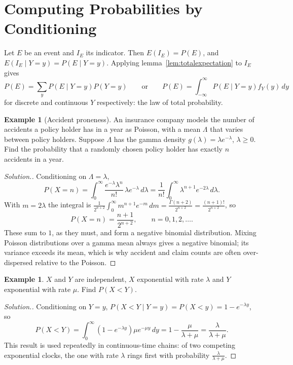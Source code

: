 \documentclass[12pt,a4paper]{report}
\theoremstyle{definition}
\newtheorem{exa}[thm]{Example}
\newenvironment{solution}
  {\renewcommand{\qedsymbol}{}\begin{proof}[\textit{Solution}.]}
  {\end{proof}}
\begin{document}
\section{Computing Probabilities by Conditioning}

Let $E$ be an event and $I_E$ its indicator. Then $E(I_E) = P(E)$, and
$E(I_E\mid Y = y) = P(E\mid Y = y)$. Applying lemma~\ref{lem:totalexpectation} to $I_E$ gives
\[P(E) = \sum_yP(E\mid Y = y)P(Y = y)\qquad\text{or}\qquad
P(E) = \int_{-\infty}^\infty P(E\mid Y = y)f_Y(y)\,dy\]
for discrete and continuous $Y$ respectively: the law of total probability.

\begin{exa}[Accident proneness]
\label{ex:accidents}
An insurance company models the number of accidents a policy holder has in a year as
Poisson, with a mean $\Lambda$ that varies between policy holders. Suppose $\Lambda$ has the
gamma density $g(\lambda) = \lambda e^{-\lambda}$, $\lambda\geq 0$. Find the probability that a
randomly chosen policy holder has exactly $n$ accidents in a year.
\end{exa}

\begin{solution}
Conditioning on $\Lambda = \lambda$,
\[P(X = n) = \int_0^\infty\frac{e^{-\lambda}\lambda^n}{n!}\,\lambda e^{-\lambda}\,d\lambda
= \frac{1}{n!}\int_0^\infty\lambda^{n + 1}e^{-2\lambda}\,d\lambda .\]
With $m = 2\lambda$ the integral is $\frac{1}{2^{n + 2}}\int_0^\infty m^{n + 1}e^{-m}\,dm = \frac{\Gamma(n + 2)}{2^{n + 2}} = \frac{(n + 1)!}{2^{n + 2}}$, so
\[P(X = n) = \frac{n + 1}{2^{n + 2}},\qquad n = 0, 1, 2, \dots .\]
These sum to $1$, as they must, and form a negative binomial distribution. Mixing
Poisson distributions over a gamma mean always gives a negative binomial; its variance
exceeds its mean, which is why accident and claim counts are often over-dispersed
relative to the Poisson.
\end{solution}

\begin{exa}
\label{ex:uniformcompare}
$X$ and $Y$ are independent, $X$ exponential with rate $\lambda$ and $Y$ exponential with rate
$\mu$. Find $P(X<Y)$.
\end{exa}

\begin{solution}
Conditioning on $Y = y$, $P(X<Y\mid Y = y) = P(X<y) = 1 - e^{-\lambda y}$, so
\[P(X<Y) = \int_0^\infty(1 - e^{-\lambda y})\mu e^{-\mu y}\,dy = 1 - \frac{\mu}{\lambda + \mu} = \frac{\lambda}{\lambda + \mu} .\]
This result is used repeatedly in continuous-time chains: of two competing exponential
clocks, the one with rate $\lambda$ rings first with probability $\frac{\lambda}{\lambda + \mu}$.
\end{solution}
\end{document}
